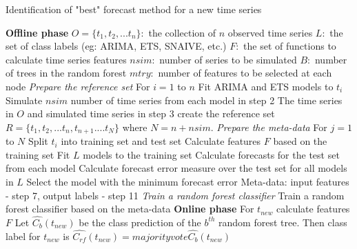 \documentclass[11pt,]{article}
\theoremstyle{definition}
\theoremstyle{definition}
\theoremstyle{definition}
\theoremstyle{remark}
\begin{document}
\begin{algorithm}
  \caption{Identification of "best" forecast method for a new time series}
  \label{alg:algo-lab}
  \begin{algorithmic}[1]
    \Statex \textbf{Offline phase}
    \Statex {}
    \Statex \hspace{1cm}$O=\{t_1, t_2, ...t_n\}:$ the collection of $n$ observed time series
      \Statex \hspace{1cm}$L:$ the set of class labels (eg: ARIMA, ETS, SNAIVE, etc.)
         \Statex \hspace{1cm}$F:$ the set of functions to calculate time series features
         \Statex \hspace{1cm}$nsim:$ number of series to be simulated
         \Statex \hspace{1cm}$B:$ number of trees in the random forest
         \Statex \hspace{1cm}$mtry:$ number of features to be selected at each node
     \Statex {}
      \Statex \hspace{1cm} 
      \Statex
     \Statex \textit{Prepare the reference set}
    \Statex For $i=1$ to $n$
    \State Fit ARIMA and ETS models to $t_i$
    \State Simulate $nsim$ number of time series from each model in step 2
    \State The time series in $O$ and simulated time series in step 3 create the reference set $R=\{t_1, t_2, ...t_n, t_{n+1}....t_N\}$ where $N = n + nsim$.
    \Statex 
    \Statex \textit{Prepare the meta-data}
    \Statex For $j=1$ to $N$
    \State Split $t_i$ into training set and test set
    \State Calculate features $F$ based on the training set 
    \State Fit $L$ models to the training set
    \State Calculate forecasts for the test set from each model
    \State Calculate forecast error measure over the test set for all models in $L$
    \State Select the model with the minimum forecast error
    \State Meta-data: input features - step 7, output labels - step 11
     \Statex
    \Statex \textit{Train a random forest classifier}
    \State Train a random forest classifier based on the meta-data
    \Statex
     \Statex \textbf{Online phase}
    \Statex {}
    \Statex \hspace{1cm} 
     \Statex {}
      \Statex \hspace{1cm} 
  \State For $t_{new}$ calculate features $F$
  \State Let $\hat{C_b}(t_{new})$ be the class prediction of the $b^{th}$ random forest tree. Then class label for $t_{new}$ is $\hat{C_{rf}}(t_{new})=majorityvote{\hat{C_b}(t_{new})}$
   \end{algorithmic}
\end{algorithm}
\end{document}
